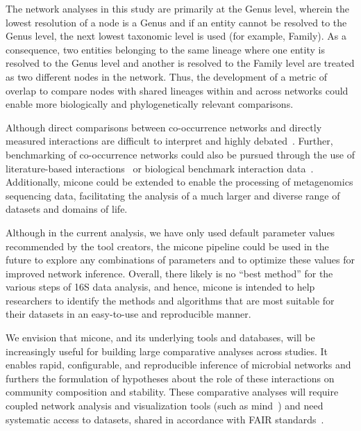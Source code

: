   The network analyses in this study are primarily at the Genus level, wherein the lowest resolution of a node is a Genus and if an entity cannot be resolved to the Genus level, the next lowest taxonomic level is used (for example, Family).
  As a consequence, two entities belonging to the same lineage where one entity is resolved to the Genus level and another is resolved to the Family level are treated as two different nodes in the network.
  Thus, the development of a metric of overlap to compare nodes with shared lineages within and across networks could enable more biologically and phylogenetically relevant comparisons.

  Although direct comparisons between co-occurrence networks and directly measured interactions are difficult to interpret and highly debated~\cite{hiranoDifficultyInferringMicrobial2019,gobernaCautionaryNotesUse2022}.
  Further, benchmarking of co-occurrence networks could also be pursued through the use of literature-based interactions~\cite{lima-mendezDeterminantsCommunityStructure2015a} or biological benchmark interaction data~\cite{sungGlobalMetabolicInteraction2017a}.
  Additionally, \ac{micone} could be extended to enable the processing of metagenomics sequencing data, facilitating the analysis of a much larger and diverse range of datasets and domains of life.

  Although in the current analysis, we have only used default parameter values recommended by the tool creators, the \ac{micone} pipeline could be used in the future to explore any combinations of parameters and to optimize these values for improved network inference.
  Overall, there likely is no ``best method'' for the various steps of 16S data analysis, and hence, \ac{micone} is intended to help researchers to identify the methods and algorithms that are most suitable for their datasets in an easy-to-use and reproducible manner.

  We envision that \ac{micone}, and its underlying tools and databases, will be increasingly useful for building large comparative analyses across studies.
  It enables rapid, configurable, and reproducible inference of microbial networks and furthers the formulation of hypotheses about the role of these interactions on community composition and stability.
  These comparative analyses will require coupled network analysis and visualization tools (such as \ac{mind}~\cite{huResourceComparisonIntegration2022}) and need systematic access to datasets, shared in accordance with FAIR standards~\cite{pachecoFAIRRepresentationsMicrobial2022}.
